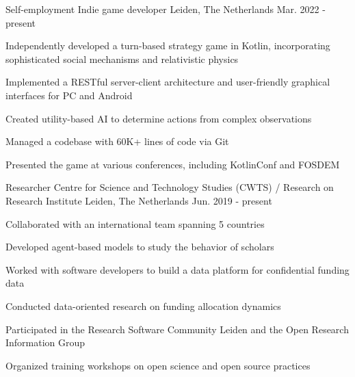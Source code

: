 

\begin{cventries}

  \cventry
    {Self-employment} %
    {Indie game developer} %
    {Leiden, The Netherlands} %
    {Mar. 2022 - present} %
    {
      \begin{cvitems} %
        \item{Independently developed a turn-based strategy game in Kotlin, incorporating sophisticated social mechanisms and relativistic physics}
        \item{Implemented a RESTful server-client architecture and user-friendly graphical interfaces for PC and Android}
        \item{Created utility-based AI to determine actions from complex observations}
        \item{Managed a codebase with 60K+ lines of code via Git}
        \item{Presented the game at various conferences, including KotlinConf and FOSDEM}
      \end{cvitems}
    }

  \cventry
    {Researcher} %
    {Centre for Science and Technology Studies (CWTS) / Research on Research Institute} %
    {Leiden, The Netherlands} %
    {Jun. 2019 - present} %
    {
      \begin{cvitems} %
        \item{Collaborated with an international team spanning 5 countries}
        \item{Developed agent-based models to study the behavior of scholars}
        \item{Worked with software developers to build a data platform for confidential funding data}
        \item{Conducted data-oriented research on funding allocation dynamics}
        \item{Participated in the Research Software Community Leiden and the Open Research Information Group}
        \item{Organized training workshops on open science and open source practices}
      \end{cvitems}
    }


\end{cventries}

